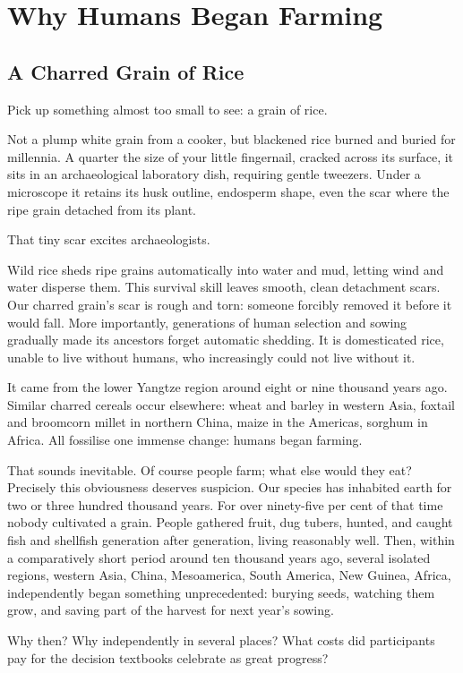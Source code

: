 \chapter{Why Humans Began Farming}
\section{A Charred Grain of Rice}
Pick up something almost too small to see: a grain of rice.

Not a plump white grain from a cooker, but blackened rice burned and buried for millennia. A quarter the size of your little fingernail, cracked across its surface, it sits in an archaeological laboratory dish, requiring gentle tweezers. Under a microscope it retains its husk outline, endosperm shape, even the scar where the ripe grain detached from its plant.

That tiny scar excites archaeologists.

Wild rice sheds ripe grains automatically into water and mud, letting wind and water disperse them. This survival skill leaves smooth, clean detachment scars. Our charred grain's scar is rough and torn: someone forcibly removed it before it would fall. More importantly, generations of human selection and sowing gradually made its ancestors forget automatic shedding. It is domesticated rice, unable to live without humans, who increasingly could not live without it.

It came from the lower Yangtze region around eight or nine thousand years ago. Similar charred cereals occur elsewhere: wheat and barley in western Asia, foxtail and broomcorn millet in northern China, maize in the Americas, sorghum in Africa. All fossilise one immense change: humans began farming.

That sounds inevitable. Of course people farm; what else would they eat? Precisely this obviousness deserves suspicion. Our species has inhabited earth for two or three hundred thousand years. For over ninety-five per cent of that time nobody cultivated a grain. People gathered fruit, dug tubers, hunted, and caught fish and shellfish generation after generation, living reasonably well. Then, within a comparatively short period around ten thousand years ago, several isolated regions, western Asia, China, Mesoamerica, South America, New Guinea, Africa, independently began something unprecedented: burying seeds, watching them grow, and saving part of the harvest for next year's sowing.

Why then? Why independently in several places? What costs did participants pay for the decision textbooks celebrate as great progress?

